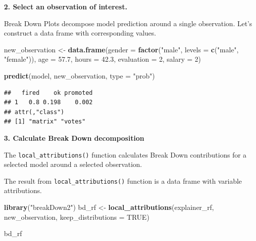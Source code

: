 \documentclass[]{krantz}
\newenvironment{Shaded}{\begin{snugshade}}{\end{snugshade}}
\newcommand{\DataTypeTok}[1]{\textcolor[rgb]{0.13,0.29,0.53}{#1}}
\newcommand{\DecValTok}[1]{\textcolor[rgb]{0.00,0.00,0.81}{#1}}
\newcommand{\FloatTok}[1]{\textcolor[rgb]{0.00,0.00,0.81}{#1}}
\newcommand{\KeywordTok}[1]{\textcolor[rgb]{0.13,0.29,0.53}{\textbf{#1}}}
\newcommand{\NormalTok}[1]{#1}
\newcommand{\OperatorTok}[1]{\textcolor[rgb]{0.81,0.36,0.00}{\textbf{#1}}}
\newcommand{\OtherTok}[1]{\textcolor[rgb]{0.56,0.35,0.01}{#1}}
\newcommand{\StringTok}[1]{\textcolor[rgb]{0.31,0.60,0.02}{#1}}
\theoremstyle{definition}
\theoremstyle{definition}
\theoremstyle{definition}
\theoremstyle{remark}
\begin{document}
\begin{Shaded}
\end{Shaded}

\textbf{2. Select an observation of interest.}

Break Down Plots decompose model prediction around a single observation.
Let's construct a data frame with corresponding values.

\begin{Shaded}
\begin{Highlighting}[]
\NormalTok{new_observation <-}\StringTok{ }\KeywordTok{data.frame}\NormalTok{(}\DataTypeTok{gender =} \KeywordTok{factor}\NormalTok{(}\StringTok{"male"}\NormalTok{, }\DataTypeTok{levels =} \KeywordTok{c}\NormalTok{(}\StringTok{"male"}\NormalTok{, }\StringTok{"female"}\NormalTok{)),}
                      \DataTypeTok{age =} \FloatTok{57.7}\NormalTok{,}
                      \DataTypeTok{hours =} \FloatTok{42.3}\NormalTok{,}
                      \DataTypeTok{evaluation =} \DecValTok{2}\NormalTok{,}
                      \DataTypeTok{salary =} \DecValTok{2}\NormalTok{)}

\KeywordTok{predict}\NormalTok{(model, new_observation, }\DataTypeTok{type =} \StringTok{"prob"}\NormalTok{)}
\end{Highlighting}
\end{Shaded}

\begin{verbatim}
##   fired    ok promoted
## 1   0.8 0.198    0.002
## attr(,"class")
## [1] "matrix" "votes"
\end{verbatim}

\textbf{3. Calculate Break Down decomposition}

The \texttt{local\_attributions()} function calculates Break Down
contributions for a selected model around a selected observation.

The result from \texttt{local\_attributions()} function is a data frame
with variable attributions.

\begin{Shaded}
\begin{Highlighting}[]
\KeywordTok{library}\NormalTok{(}\StringTok{"breakDown2"}\NormalTok{)}
\NormalTok{bd_rf <-}\StringTok{ }\KeywordTok{local_attributions}\NormalTok{(explainer_rf,}
\NormalTok{                 new_observation,}
                 \DataTypeTok{keep_distributions =} \OtherTok{TRUE}\NormalTok{)}

\NormalTok{bd_rf}
\end{Highlighting}
\end{Shaded}
\end{document}
